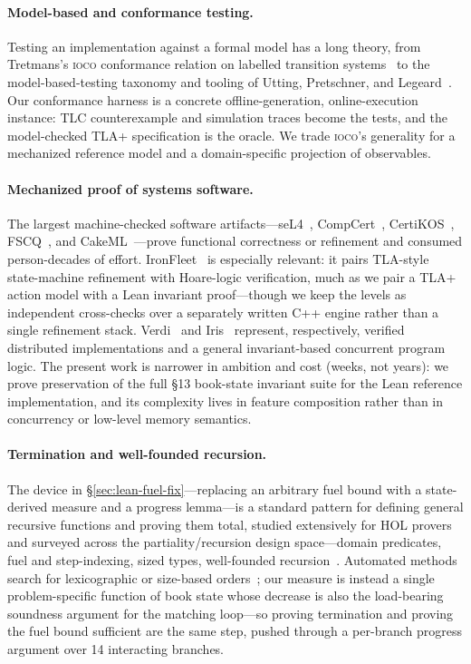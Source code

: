 \documentclass[11pt,a4paper]{article}
\begin{document}
\paragraph{Model-based and conformance testing.}
Testing an implementation against a formal model has a long theory, from
Tretmans's \textsc{ioco} conformance relation on labelled transition
systems~\cite{Tretmans2008} to the model-based-testing taxonomy and
tooling of Utting, Pretschner, and Legeard~\cite{Utting2012,Utting2007}.
Our conformance harness is a concrete offline-generation,
online-execution instance: TLC counterexample and simulation traces
become the tests, and the model-checked TLA+ specification is the
oracle. We trade \textsc{ioco}'s generality for a mechanized reference
model and a domain-specific projection of observables.

\paragraph{Mechanized proof of systems software.}
The largest machine-checked software artifacts---seL4~\cite{Klein2009},
CompCert~\cite{Leroy2009}, CertiKOS~\cite{Gu2016}, FSCQ~\cite{FSCQ2015},
and CakeML~\cite{CakeML2014}---prove functional correctness or
refinement and consumed person-decades of effort.
IronFleet~\cite{IronFleet2015} is especially relevant: it pairs
TLA-style state-machine refinement with Hoare-logic verification, much
as we pair a TLA+ action model with a Lean invariant proof---though we
keep the levels as independent cross-checks over a separately written
C++ engine rather than a single refinement stack.
Verdi~\cite{Verdi2015} and Iris~\cite{Iris2015} represent, respectively,
verified distributed implementations and a general invariant-based
concurrent program logic. The present work is narrower in ambition and
cost (weeks, not years): we prove preservation of the full \S13
book-state invariant suite for the Lean reference implementation, and
its complexity lives in feature composition rather than in concurrency
or low-level memory semantics.

\paragraph{Termination and well-founded recursion.}
The device in \S\ref{sec:lean-fuel-fix}---replacing an arbitrary fuel
bound with a state-derived measure and a progress lemma---is a standard
pattern for defining general recursive functions and proving them total,
studied extensively for HOL provers~\cite{Krauss2009,Bulwahn2007,%
Krauss2011,Manolios2006} and surveyed across the partiality/recursion
design space---domain predicates, fuel and step-indexing, sized types,
well-founded recursion~\cite{Bove2016,Abel2013,Leino2013}. Automated
methods search for lexicographic or size-based orders~\cite{Bulwahn2007};
our measure is instead a single problem-specific function of book state
whose decrease is also the load-bearing soundness argument for the
matching loop---so proving termination and proving the fuel bound
sufficient are the same step, pushed through a per-branch progress
argument over 14 interacting branches.
\end{document}
